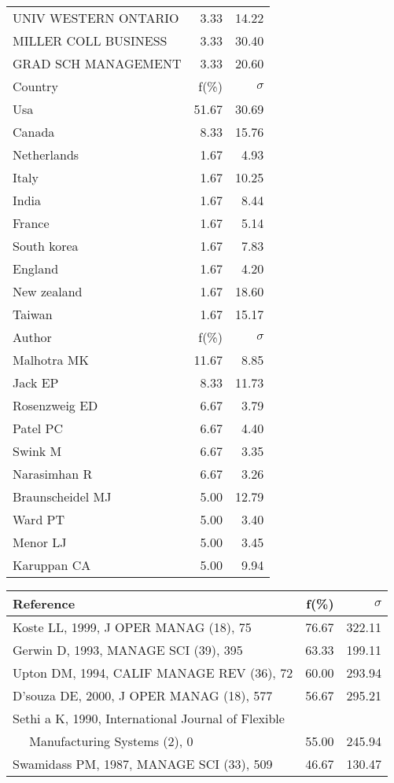 \documentclass[a4paper,11pt]{report}
\begin{document}
\begin{landscape}
\begin{table}[!ht]
{\begin{tabular}{|l r r|}
UNIV WESTERN ONTARIO & 3.33 & 14.22\\
MILLER COLL BUSINESS & 3.33 & 30.40\\
GRAD SCH MANAGEMENT & 3.33 & 20.60\\
\hline
\hline
Country & f(\%) & $\sigma$\\
\hline
Usa & 51.67 & 30.69\\
Canada & 8.33 & 15.76\\
Netherlands & 1.67 & 4.93\\
Italy & 1.67 & 10.25\\
India & 1.67 & 8.44\\
France & 1.67 & 5.14\\
South korea & 1.67 & 7.83\\
England & 1.67 & 4.20\\
New zealand & 1.67 & 18.60\\
Taiwan & 1.67 & 15.17\\
\hline
\hline
Author & f(\%) & $\sigma$\\
\hline
Malhotra MK & 11.67 & 8.85\\
Jack EP & 8.33 & 11.73\\
Rosenzweig ED & 6.67 & 3.79\\
Patel PC & 6.67 & 4.40\\
Swink M & 6.67 & 3.35\\
Narasimhan R & 6.67 & 3.26\\
Braunscheidel MJ & 5.00 & 12.79\\
Ward PT & 5.00 & 3.40\\
Menor LJ & 5.00 & 3.45\\
Karuppan CA & 5.00 & 9.94\\
\hline
\end{tabular}
}
{\scriptsize\begin{tabular}{|l r r|}
\hline
Reference & f(\%) & $\sigma$\\
\hline
Koste LL, 1999, J OPER MANAG (18), 75 & 76.67 & 322.11\\
Gerwin D, 1993, MANAGE SCI (39), 395 & 63.33 & 199.11\\
Upton DM, 1994, CALIF MANAGE REV (36), 72 & 60.00 & 293.94\\
D'souza DE, 2000, J OPER MANAG (18), 577 & 56.67 & 295.21\\
Sethi a K, 1990, International Journal of Flexible &  & \\
$\quad$ Manufacturing Systems (2), 0 & 55.00 & 245.94\\
Swamidass PM, 1987, MANAGE SCI (33), 509 & 46.67 & 130.47\\

\end{tabular}}
\end{table}
\end{landscape}
\end{document}

